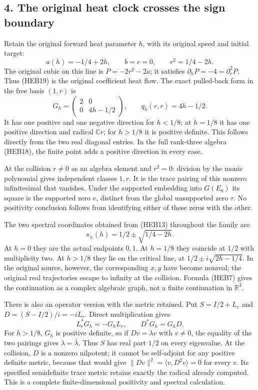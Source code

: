 \documentclass[
  10pt,
  a4paper,
]{article}
\begin{document}
\subsection{4. The original heat clock crosses the sign
boundary}\label{the-original-heat-clock-crosses-the-sign-boundary}

Retain the original forward heat parameter \(h\), with its original
speed and initial target: \[
a(h)=-1/4+2h,\qquad b=c=0,\qquad
r^2=1/4-2h.
\tag{HEB19}
\] The original cubic on this line is \(P=-2r^2-2a\); it satisfies
\(\partial_hP=-4=\partial_r^2P\). Thus (HEB19) is the original
coefficient heat flow. The exact pulled-back form in the free basis
\((1,r)\) is \[
G_h=\begin{pmatrix}2&0\\0&4h-1/2\end{pmatrix},
\qquad q_h(r,r)=4h-1/2.
\tag{HEB20}
\] It has one positive and one negative direction for \(h<1/8\); at
\(h=1/8\) it has one positive direction and radical \(\mathbb C r\); for
\(h>1/8\) it is positive definite. This follows directly from the two
real diagonal entries. In the full rank-three algebra (HEB18), the
finite point adds a positive direction in every case.

At the collision \(r\ne0\) as an algebra element and \(r^2=0\): division
by the monic polynomial gives independent classes \(1,r\). It is the
trace pairing of this nonzero infinitesimal that vanishes. Under the
supported embedding into \(G(E_0)\) its square is the supported zero
\(e\), distinct from the global unsupported zero \(\tau\). No positivity
conclusion follows from identifying either of these zeros with the
other.

The two spectral coordinates obtained from (HEB13) throughout the family
are \[
s_\pm(h)=1/2\pm\sqrt{1/4-2h}.
\tag{HEB21}
\] At \(h=0\) they are the actual endpoints \(0,1\). At \(h=1/8\) they
coincide at \(1/2\) with multiplicity two. At \(h>1/8\) they lie on the
critical line, at \(1/2\pm i\sqrt{2h-1/4}\). In the original source,
however, the corresponding \(x,y\) have become nonreal; the original
real trajectories escape to infinity at the collision. Formula (HEB7)
gives the continuation as a complex algebraic graph, not a finite
continuation in \(\mathbb R^3\).

There is also an operator version with the metric retained. Put
\(S=I/2+L_r\) and \(D=(S-I/2)/i=-iL_r\). Direct multiplication gives \[
L_r^*G_h=-G_hL_r,\qquad D^*G_h=G_hD.
\tag{HEB22}
\] For \(h>1/8\), \(G_h\) is positive definite, so if \(Dv=\lambda v\)
with \(v\ne0\), the equality of the two pairings gives
\(\lambda=\bar\lambda\). Thus \(S\) has real part \(1/2\) on every
eigenvalue. At the collision, \(D\) is a nonzero nilpotent; it cannot be
self-adjoint for any positive definite metric, because that would give
\(\|Dv\|^2=\langle v,D^2v\rangle=0\) for every \(v\). Its specified
semidefinite trace metric retains exactly the radical already computed.
This is a complete finite-dimensional positivity and spectral
calculation.
\end{document}
